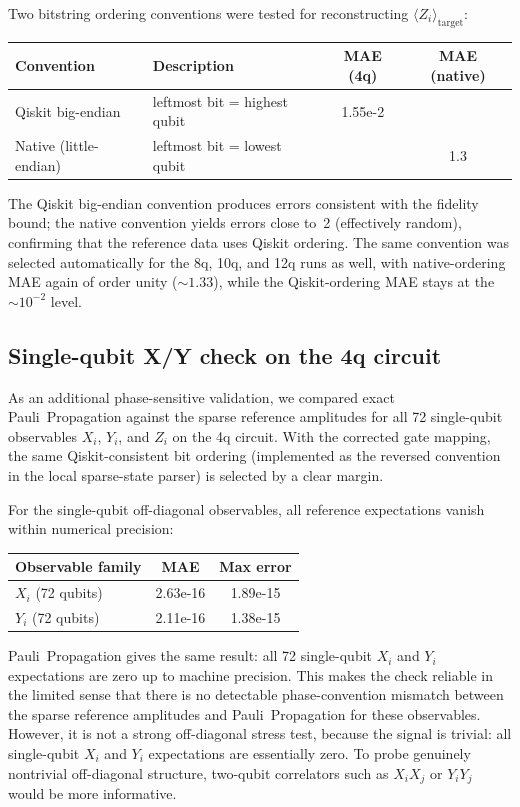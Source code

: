 \documentclass[11pt]{article}
\begin{document}
Two bitstring ordering conventions were tested for reconstructing $\langle Z_i\rangle_{\mathrm{target}}$:
\begin{center}
\begin{tabular}{llS[table-format=1.2e-1]S[table-format=1.1]}
\toprule
Convention & Description & {MAE (4q)} & {MAE (native)} \\
\midrule
Qiskit big-endian & leftmost bit = highest qubit & 1.55e-2 & \\
Native (little-endian) & leftmost bit = lowest qubit & & 1.3 \\
\bottomrule
\end{tabular}
\end{center}
The Qiskit big-endian convention produces errors consistent with the fidelity bound; the native convention yields errors close to~2 (effectively random), confirming that the reference data uses Qiskit ordering.
The same convention was selected automatically for the 8q, 10q, and 12q runs as well, with native-ordering MAE again of order unity ($\sim 1.33$), while the Qiskit-ordering MAE stays at the $\sim 10^{-2}$ level.

\subsection{Single-qubit X/Y check on the 4q circuit}

As an additional phase-sensitive validation, we compared exact Pauli~Propagation against the sparse reference amplitudes for all 72 single-qubit observables $X_i$, $Y_i$, and $Z_i$ on the 4q circuit.
With the corrected gate mapping, the same Qiskit-consistent bit ordering (implemented as the reversed convention in the local sparse-state parser) is selected by a clear margin.

For the single-qubit off-diagonal observables, all reference expectations vanish within numerical precision:
\begin{center}
\begin{tabular}{lS[table-format=1.2e-1]S[table-format=1.2e-1]}
\toprule
Observable family & {MAE} & {Max error} \\
\midrule
$X_i$ (72 qubits) & 2.63e-16 & 1.89e-15 \\
$Y_i$ (72 qubits) & 2.11e-16 & 1.38e-15 \\
\bottomrule
\end{tabular}
\end{center}
Pauli~Propagation gives the same result: all 72 single-qubit $X_i$ and $Y_i$ expectations are zero up to machine precision.
This makes the check reliable in the limited sense that there is no detectable phase-convention mismatch between the sparse reference amplitudes and Pauli~Propagation for these observables.
However, it is not a strong off-diagonal stress test, because the signal is trivial: all single-qubit $X_i$ and $Y_i$ expectations are essentially zero.
To probe genuinely nontrivial off-diagonal structure, two-qubit correlators such as $X_iX_j$ or $Y_iY_j$ would be more informative.
\end{document}
